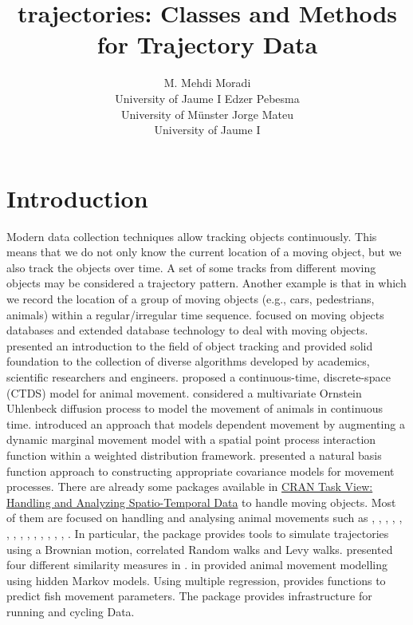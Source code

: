 \documentclass[article]{jss}
\author{M. Mehdi Moradi\\University of Jaume I
    \And Edzer Pebesma\\University of M\"unster
    \And Jorge Mateu\\University of Jaume I}
\title{trajectories: Classes and Methods for Trajectory Data}
\begin{document}
\section[Introduction]{Introduction}\label{sec:intro}
Modern data collection techniques allow tracking objects continuously. This means that we do not only know the current location of a moving object, but we also track the objects over time. A set of some tracks from different moving objects may be considered a trajectory pattern. Another example is that in which we record the location of a group of moving objects (e.g., cars, pedestrians, animals) within a regular/irregular time sequence. \cite{guting05} focused on moving objects databases and extended database technology to deal with moving objects. \cite{challa2011} presented an introduction to the field of object tracking and provided solid foundation to the collection of diverse algorithms developed by academics, scientific researchers and engineers. \cite{hanks15} proposed a continuous-time, discrete-space (CTDS) model for animal movement. \cite{niu2016modeling} considered a multivariate Ornstein Uhlenbeck diffusion process to model the movement of animals in continuous time. \cite{russell16} introduced an approach that models dependent movement by augmenting a dynamic marginal movement model with a spatial point process interaction function within a weighted distribution framework. \cite{hooten17} presented a natural basis function approach to constructing appropriate covariance models for movement processes. There are already some  packages available in \href{https://cran.r-project.org}{CRAN Task View: Handling and Analyzing Spatio-Temporal Data} to handle moving objects. Most of them are focused on handling and analysing animal movements such as  \citep{calenge06},  \citep{sumner2009},  \citep{argosf},  \citep{V-Track},  \citep{animalTrack},  \citep{BBMM},  \citep{bcpa},  \citep{BayesianAnimalTracker},  \citep{TrackReconstruction},  \citep{mkde},  \citep{SimilarityMeasures},  \citep{smam}, \citep{trip},  \citep{moveHMM},  \citep{FLightR}. In particular, the package  \citep{calenge06} provides tools to simulate trajectories using a Brownian motion, correlated Random walks and Levy walks. \cite{SimilarityMeasures} presented four different similarity measures in . \cite{moveHMM} in  provided animal movement modelling using hidden Markov models. Using multiple regression,  \citep{fishmove}  provides functions to predict fish movement parameters. The  package  \citep{frick} provides infrastructure for running and cycling Data.
\end{document}
